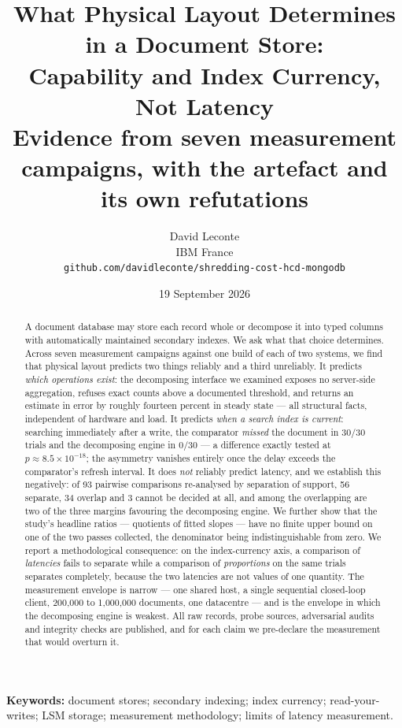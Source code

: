 \documentclass[11pt,a4paper]{article}
\title{\bfseries What Physical Layout Determines in a Document Store:\\
Capability and Index Currency, Not Latency\\
\large\normalfont Evidence from seven measurement campaigns,
with the artefact and its own refutations}
\author{%
  David Leconte\\
  \small IBM France\\
  \small \texttt{github.com/davidleconte/shredding-cost-hcd-mongodb}%
}
\date{19 September 2026}
\begin{document}
\maketitle

\begin{abstract}
\noindent
A document database may store each record whole or decompose it into typed columns with
automatically maintained secondary indexes. We ask what that choice determines. Across seven
measurement campaigns against one build of each of two systems, we find that physical layout
predicts two things reliably and a third unreliably. It predicts \emph{which operations exist}:
the decomposing interface we examined exposes no server-side aggregation, refuses exact counts
above a documented threshold, and returns an estimate in error by roughly fourteen percent in
steady state --- all structural facts, independent of hardware and load. It predicts \emph{when a
search index is current}: searching immediately after a write, the comparator
\emph{missed} the document in $30/30$ trials and the decomposing engine in $0/30$ --- a difference
exactly tested at $p \approx 8.5\times10^{-18}$; the asymmetry vanishes entirely once the delay exceeds the
comparator's refresh interval. It does \emph{not} reliably predict latency, and we establish this
negatively: of 93 pairwise comparisons re-analysed by separation of support, 56 separate,
34 overlap and 3 cannot be decided at all, and among the overlapping are two of the three margins
favouring the decomposing engine. We further show that the study's
headline ratios --- quotients of fitted slopes --- have no finite upper bound on one of the two
passes collected, the denominator being indistinguishable from zero. We report a methodological
consequence: on the index-currency axis, a comparison of \emph{latencies} fails to separate while a
comparison of \emph{proportions} on the same trials separates completely, because the two latencies
are not values of one quantity. The measurement envelope is narrow --- one shared host, a single
sequential closed-loop client, 200{,}000 to 1{,}000{,}000 documents, one datacentre --- and is the
envelope in which the decomposing engine is weakest. All raw records, probe sources, adversarial
audits and integrity checks are published, and for each claim we pre-declare the measurement that
would overturn it.
\end{abstract}

\vspace{0.5em}
\noindent\textbf{Keywords:} document stores; secondary indexing; index currency; read-your-writes;
LSM storage; measurement methodology; limits of latency measurement.
\end{document}
